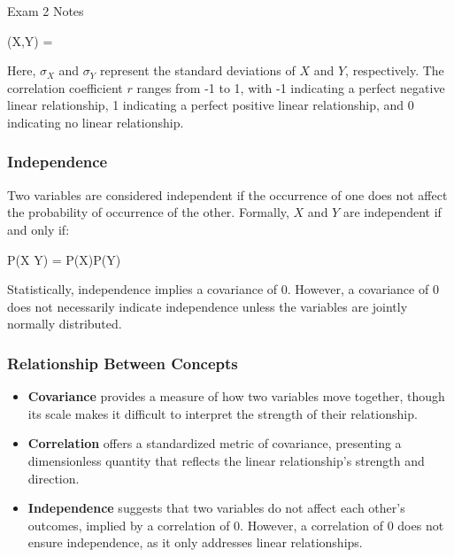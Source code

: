 \begin{examnotes}{Exam 2 Notes}
    \begin{center}
        \begin{highlightbox}
            \rho(X,Y) = 
        \end{highlightbox}
    \end{center}
    Here, $\sigma_X$ and $\sigma_Y$ represent the standard deviations of $X$ and $Y$, respectively. The correlation coefficient $r$ ranges from -1 to 1, with -1 indicating a perfect negative linear 
    relationship, 1 indicating a perfect positive linear relationship, and 0 indicating no linear relationship.
    
    \subsubsection*{Independence}
    
    Two variables are considered independent if the occurrence of one does not affect the probability of occurrence of the other. Formally, $X$ and $Y$ are independent if and only if:
    
    \begin{center}
        \begin{highlightbox}
            P(X \cap Y) = P(X)P(Y)
        \end{highlightbox}
    \end{center}
    
    Statistically, independence implies a covariance of 0. However, a covariance of 0 does not necessarily indicate independence unless the variables are jointly normally distributed.
    
    \subsubsection*{Relationship Between Concepts}
    
    \begin{itemize}
        \item \textbf{Covariance} provides a measure of how two variables move together, though its scale makes it difficult to interpret the strength of their relationship.
        \item \textbf{Correlation} offers a standardized metric of covariance, presenting a dimensionless quantity that reflects the linear relationship's strength and direction.
        \item \textbf{Independence} suggests that two variables do not affect each other's outcomes, implied by a correlation of 0. However, a correlation of 0 does not ensure independence, as it only 
        addresses linear relationships.
    \end{itemize}


\end{examnotes}
